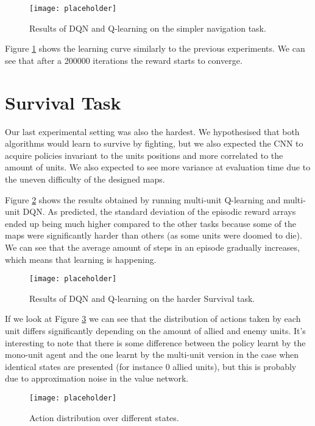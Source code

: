 \begin{figure}[h]
    \centering
    \texttt{[image: placeholder]}
    \caption{Results of DQN and Q-learning on the simpler navigation task.}
    \label{fig:guid_task_results}
\end{figure}

Figure \ref{fig:guid_task_results} shows the learning curve similarly to the
previous experiments. We can see that after a 200000 iterations the reward
starts to converge. 

\section{Survival Task}

Our last experimental setting was also the hardest. We hypothesised that both
algorithms would learn to survive by fighting, but we also expected the CNN to
acquire policies invariant to the units positions and more correlated to the
amount of units. We also expected to see more variance at evaluation time due to
the uneven difficulty of the designed maps.


Figure \ref{fig:surv_task_results} shows the results obtained by running
multi-unit Q-learning and multi-unit DQN. As predicted, the standard deviation
of the episodic reward arrays ended up being much higher compared to the other
tasks because some of the maps were significantly harder than others (as some
units were doomed to die). We can see that the average amount of steps in an
episode gradually increases, which means that learning is happening.

\begin{figure}[h]
    \centering
    \texttt{[image: placeholder]}
    \caption{Results of DQN and Q-learning on the harder Survival task.}
    \label{fig:surv_task_results}
\end{figure}

If we look at Figure \ref{fig:dif_pol} we can see that the distribution of
actions taken by each unit differs significantly depending on the amount of
allied and enemy units. It's interesting to note that there is some difference
between the policy learnt by the mono-unit agent and the one learnt by the
multi-unit version in the case when identical states are presented (for instance
0 allied units), but this is probably due to approximation noise in the
value network.

\begin{figure}[h]
    \centering
    \texttt{[image: placeholder]}
    \caption{Action distribution over different states.}
    \label{fig:dif_pol}
\end{figure}

